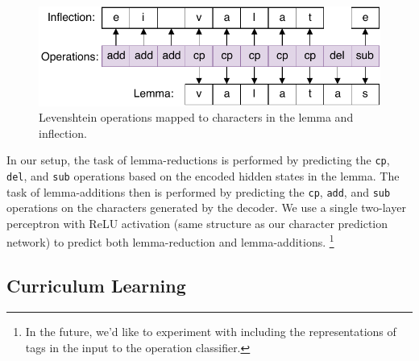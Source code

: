 \documentclass[11pt,a4paper]{article}
\newcommand\jp[1]{\textbf{JP: #1}}
\begin{document}

\begin{figure}[ht]
\centering
\includegraphics[scale=0.5]{ops.pdf}
\caption{\label{fig:ops} Levenshtein operations mapped to characters in the lemma and
inflection.}
\end{figure}

In our setup, the task of lemma-reductions is performed by predicting
the \texttt{cp}, \texttt{del}, and \texttt{sub} operations based on
the encoded hidden states in the lemma.  The task of lemma-additions
then is performed by predicting the \texttt{cp}, \texttt{add}, and
\texttt{sub} operations on the characters generated by the decoder.
We use a single two-layer perceptron with ReLU activation (same
structure as our character prediction network) to predict both
lemma-reduction and lemma-additions. \footnote{In the future, we'd
like to experiment with including the representations of tags in the
input to the operation classifier.}




\subsection{Curriculum Learning}

\end{document}
